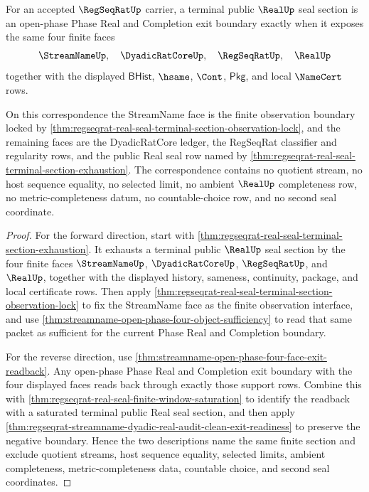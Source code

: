 \begin{theorem}
\label{thm:streamname-open-phase-real-regseqrat-exit-correspondence}
For an accepted $\RegSeqRatUp$ carrier, a terminal public $\RealUp$ seal
section is an open-phase Phase Real and Completion exit boundary exactly when
it exposes the same four finite faces
$$
\StreamNameUp,\quad \DyadicRatCoreUp,\quad \RegSeqRatUp,\quad \RealUp
$$
together with the displayed $\mathsf{BHist}$, $\hsame$, $\Cont$,
$\mathsf{Pkg}$, and local $\NameCert$ rows.

On this correspondence the StreamName face is the finite observation boundary
locked by \autoref{thm:regseqrat-real-seal-terminal-section-observation-lock},
and the remaining faces are the DyadicRatCore ledger, the RegSeqRat classifier
and regularity rows, and the public Real seal row named by
\autoref{thm:regseqrat-real-seal-terminal-section-exhaustion}. The
correspondence contains no quotient stream, no host sequence equality, no
selected limit, no ambient $\RealUp$ completeness row, no metric-completeness
datum, no countable-choice row, and no second seal coordinate.
\end{theorem}
\begin{proof}
For the forward direction, start with
\autoref{thm:regseqrat-real-seal-terminal-section-exhaustion}. It exhausts a
terminal public $\RealUp$ seal section by the four finite faces
$\StreamNameUp$, $\DyadicRatCoreUp$, $\RegSeqRatUp$, and $\RealUp$, together
with the displayed history, sameness, continuity, package, and local
certificate rows. Then apply
\autoref{thm:regseqrat-real-seal-terminal-section-observation-lock} to fix the
StreamName face as the finite observation interface, and use
\autoref{thm:streamname-open-phase-four-object-sufficiency} to read that same
packet as sufficient for the current Phase Real and Completion boundary.

For the reverse direction, use
\autoref{thm:streamname-open-phase-four-face-exit-readback}. Any open-phase
Phase Real and Completion exit boundary with the four displayed faces reads
back through exactly those support rows. Combine this with
\autoref{thm:regseqrat-real-seal-finite-window-saturation} to identify the
readback with a saturated terminal public Real seal section, and then apply
\autoref{thm:regseqrat-streamname-dyadic-real-audit-clean-exit-readiness} to
preserve the negative boundary. Hence the two descriptions name the same
finite section and exclude quotient streams, host sequence equality, selected
limits, ambient completeness, metric-completeness data, countable choice, and
second seal coordinates.
\end{proof}

